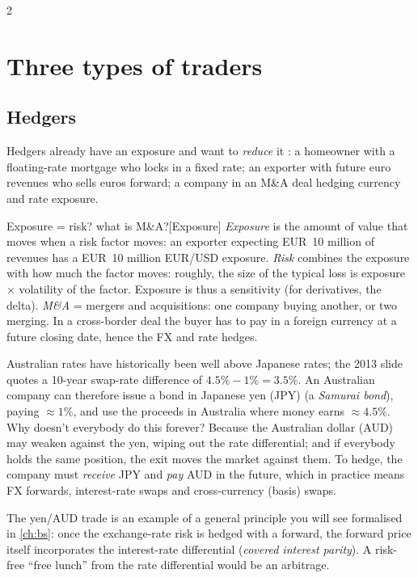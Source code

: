 \begin{paracol}{2}
\section{Three types of traders}\label{sec:tradertypes}

\subsection{Hedgers}
Hedgers already have an exposure and want to \emph{reduce} it : a homeowner
with a floating-rate mortgage who locks in a fixed rate; an exporter with future euro revenues
who sells euros forward; a company in an M\&A deal hedging currency and rate exposure.
\begin{answer}{Exposure = risk? what is M\&A?}[Exposure]
\emph{Exposure} is the amount of value that moves when a risk factor moves: an exporter expecting
EUR~10 million of revenues has a EUR~10 million EUR/USD exposure. \emph{Risk} combines the exposure
with how much the factor moves: roughly, the size of the typical loss is exposure $\times$ volatility
of the factor. Exposure is thus a sensitivity (for derivatives, the delta).
\emph{M\&A} = mergers and
acquisitions: one company buying another, or two merging. In a cross-border deal the buyer has to
pay in a foreign currency at a future closing date, hence the FX and rate hedges.
\end{answer}

\begin{example}
Australian rates have historically been well above Japanese rates; the 2013 slide quotes a
10-year swap-rate difference of $4.5\% - 1\% = 3.5\%$. An Australian company can therefore
issue a bond in Japanese yen (JPY) (a \emph{Samurai bond}), paying $\approx 1\%$, and use the proceeds in
Australia where money earns $\approx 4.5\%$. Why doesn't everybody do this forever? Because the
Australian dollar (AUD) may weaken against the yen, wiping out the rate differential; and if everybody
holds the same position, the exit moves the market against them. To hedge, the company must
\emph{receive} JPY and \emph{pay} AUD in the future, which in practice means FX forwards,
interest-rate swaps and cross-currency (basis) swaps.
\end{example}

\begin{intuition}
The yen/AUD trade is an example of a general principle you will see formalised in
\cref{ch:bs}: once the exchange-rate risk is hedged with a forward, the forward price itself
incorporates the interest-rate differential (\emph{covered interest parity}). A risk-free
``free lunch'' from the rate differential would be an arbitrage.
\end{intuition}


\end{paracol}
